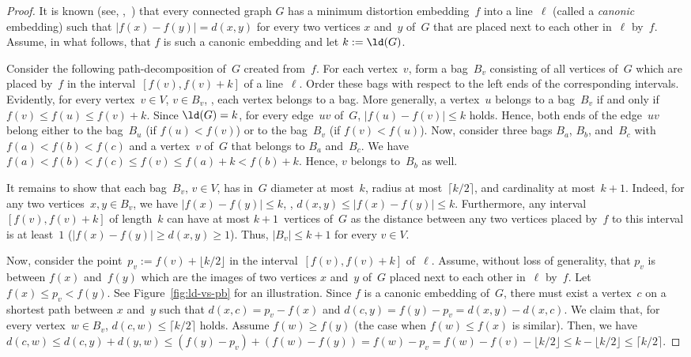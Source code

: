 \begin{proof}
It is known (see, \eg,~\cite{HeggMeisPros2011}) that every connected graph $G$ has a minimum distortion embedding~$f$ into a line~$\ell$ (called a \emph{canonic} embedding) such that $|f(x) - f(y)| = d(x, y)$ for every two vertices $x$ and~$y$ of~$G$ that are placed next to each other in~$\ell$ by~$f$.
Assume, in what follows, that $f$ is such a canonic embedding and let $k := \ld(G)$.

Consider the following path-decomposition of~$G$ created from~$f$.
For each vertex~$v$, form a bag~$B_v$ consisting of all vertices of~$G$ which are placed by~$f$ in the interval~$[f(v), f(v) + k]$ of a line~$\ell$.
Order these bags with respect to the left ends of the corresponding intervals.
Evidently, for every vertex~$v \in V$, $v \in B_v$, \ie, each vertex belongs to a bag.
More generally, a vertex~$u$ belongs to a bag~$B_v$ if and only if $f(v) \leq f(u) \leq f(v) + k$.
Since $\ld(G) = k$, for every edge~$uv$ of~$G$, $|f(u) - f(v)| \leq k$ holds.
Hence, both ends of the edge~$uv$ belong either to the bag~$B_u$ (if $f(u) < f(v)$) or to the bag~$B_v$ (if $f(v) < f(u)$).
Now, consider three bags $B_a$, $B_b$, and~$B_c$ with $f(a) < f(b) < f(c)$ and a vertex~$v$ of~$G$ that belongs to $B_a$ and~$B_c$.
We have $f(a) < f(b) < f(c) \leq f(v) \leq f(a) + k < f(b) + k$.
Hence, $v$ belongs to~$B_b$ as well.

It remains to show that each bag~$B_v$, $v \in V$, has in~$G$ diameter at most~$k$, radius at most~$\lceil k / 2 \rceil$, and cardinality at most~$k + 1$.
Indeed, for any two vertices~$x, y \in B_v$, we have $|f(x) - f(y)| \leq k$, \ie, $d(x, y) \leq |f(x) - f(y)| \leq k$.
Furthermore, any interval~$[f(v), f(v) + k]$ of length~$k$ can have at most $k + 1$~vertices of~$G$ as the distance between any two vertices placed by~$f$ to this interval is at least~$1$ ($|f(x) - f(y)| \geq d(x, y) \geq 1$).
Thus, $|B_v| \leq k + 1$ for every $v \in V$.

Now, consider the point~$p_v := f(v) + \lfloor k / 2 \rfloor$ in the interval~$[f(v), f(v) + k]$ of~$\ell$.
Assume, without loss of generality, that $p_v$ is between $f(x)$ and~$f(y)$ which are the images of two vertices $x$ and~$y$ of~$G$ placed next to each other in~$\ell$ by~$f$.
Let $f(x) \leq p_v < f(y)$.
See Figure~\ref{fig:ld-vs-pb} for an illustration.
Since $f$ is a canonic embedding of~$G$, there must exist a vertex~$c$ on a shortest path between $x$ and~$y$ such that $d(x, c) = p_v - f(x)$ and $d(c, y) = f(y) - p_v = d(x, y) - d(x, c)$.
We claim that, for every vertex~$w \in B_v$, $d(c, w) \leq \lceil k / 2 \rceil$ holds.
Assume $f(w) \geq f(y)$ (the case when $f(w) \leq f(x)$ is similar).
Then, we have $d(c, w) \leq d(c, y) + d(y, w) \leq (f(y) - p_v) + (f(w) - f(y)) = f(w) - p_v = f(w) - f(v) - \lfloor k / 2 \rfloor \leq k - \lfloor k / 2 \rfloor \leq \lceil k / 2 \rceil$.
\end{proof}

